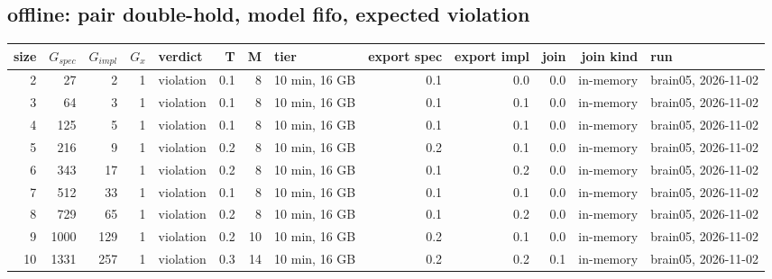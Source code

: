 \documentclass[10pt]{article}
\begin{document}
\subsection*{offline: pair \textsf{double-hold}, model fifo, expected violation}
\begin{longtable}{@{}rrrrlrrlrrrrl@{}}
\toprule
size & $G_{\mathit{spec}}$ & $G_{\mathit{impl}}$ & $G_x$ & verdict & T & M & tier & export spec & export impl & join & join kind & run \\
\midrule
\endhead
\color{red} 2 & 27 & 2 & 1 & violation & 0.1 & 8 & 10 min, 16 GB & 0.1 & 0.0 & 0.0 & in-memory & brain05, 2026-11-02 \\
\color{red} 3 & 64 & 3 & 1 & violation & 0.1 & 8 & 10 min, 16 GB & 0.1 & 0.1 & 0.0 & in-memory & brain05, 2026-11-02 \\
\color{red} 4 & 125 & 5 & 1 & violation & 0.1 & 8 & 10 min, 16 GB & 0.1 & 0.1 & 0.0 & in-memory & brain05, 2026-11-02 \\
\color{red} 5 & 216 & 9 & 1 & violation & 0.2 & 8 & 10 min, 16 GB & 0.2 & 0.1 & 0.0 & in-memory & brain05, 2026-11-02 \\
\color{red} 6 & 343 & 17 & 1 & violation & 0.2 & 8 & 10 min, 16 GB & 0.1 & 0.2 & 0.0 & in-memory & brain05, 2026-11-02 \\
\color{red} 7 & 512 & 33 & 1 & violation & 0.1 & 8 & 10 min, 16 GB & 0.1 & 0.1 & 0.0 & in-memory & brain05, 2026-11-02 \\
\color{red} 8 & 729 & 65 & 1 & violation & 0.2 & 8 & 10 min, 16 GB & 0.1 & 0.2 & 0.0 & in-memory & brain05, 2026-11-02 \\
\color{red} 9 & 1000 & 129 & 1 & violation & 0.2 & 10 & 10 min, 16 GB & 0.2 & 0.1 & 0.0 & in-memory & brain05, 2026-11-02 \\
\color{red} 10 & 1331 & 257 & 1 & violation & 0.3 & 14 & 10 min, 16 GB & 0.2 & 0.2 & 0.1 & in-memory & brain05, 2026-11-02 \\
\bottomrule
\end{longtable}
\end{document}
